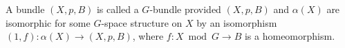 A bundle $(X, p, B)$ is called a $G$-bundle provided $(X, p, B)$ and $\alpha(X)$ are isomorphic for some $G$-space structure on $X$ by an isomorphism $(1, f): \alpha(X) \rightarrow (X, p, B)$, where $f: X \bmod G \rightarrow B$ is a homeomorphism.